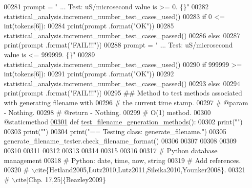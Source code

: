 \begin{DoxyCode}
00281         prompt = \textcolor{stringliteral}{"  ... Test: uS/microsecond value is >= 0.         \{\}"}
00282         statistical\_analysis.increment\_number\_test\_cases\_used()
00283         \textcolor{keywordflow}{if} 0 <= int(tokens[6]):
00284             print(prompt .format(\textcolor{stringliteral}{"OK"}))
00285             statistical\_analysis.increment\_number\_test\_cases\_passed()
00286         \textcolor{keywordflow}{else}:
00287             print(prompt .format(\textcolor{stringliteral}{"FAIL!!!"}))
00288         prompt = \textcolor{stringliteral}{"  ... Test: uS/microsecond value is <= 999999.        \{\}"}
00289         statistical\_analysis.increment\_number\_test\_cases\_used()
00290         \textcolor{keywordflow}{if} 999999 >= int(tokens[6]):
00291             print(prompt .format(\textcolor{stringliteral}{"OK"}))
00292             statistical\_analysis.increment\_number\_test\_cases\_passed()
00293         \textcolor{keywordflow}{else}:
00294             print(prompt .format(\textcolor{stringliteral}{"FAIL!!!"}))
00295     \textcolor{comment}{##  Method to test methods associated with generating filename with}
00296     \textcolor{comment}{#       the current time stamp.}
00297     \textcolor{comment}{#   @param - Nothing.}
00298     \textcolor{comment}{#   @return - Nothing.}
00299     \textcolor{comment}{#   O(1) method.}
00300     @staticmethod
\hypertarget{generate__results__filename__tester_8py_source_l00301}{}\hyperlink{classutilities_1_1generate__results__filename__tester_1_1generate__filename__tester_ab0d53bb62c79065e884afa6a184d690e}{00301}     \textcolor{keyword}{def }\hyperlink{classutilities_1_1generate__results__filename__tester_1_1generate__filename__tester_ab0d53bb62c79065e884afa6a184d690e}{test\_filename\_generation\_methods}():
00302         print(\textcolor{stringliteral}{""})
00303         print(\textcolor{stringliteral}{""})
00304         print(\textcolor{stringliteral}{"==   Testing class: generate\_filename."})
00305         generate\_filename\_tester.check\_filename\_format()
00306 
00307 
00308 
00309 
00310 
00311 
00312 
00313 
00314 
00315 
00316 
00317 \textcolor{comment}{#   Python database management}
00318 \textcolor{comment}{#   Python: date, time, now, string}
00319 \textcolor{comment}{#   Add references.}
00320 \textcolor{comment}{#   \(\backslash\)cite\{Hetland2005,Lutz2010,Lutz2011,Sileika2010,Younker2008\}.}
00321 \textcolor{comment}{#   \(\backslash\)cite[Chp. 17,25]\{Beazley2009\}}
\end{DoxyCode}
